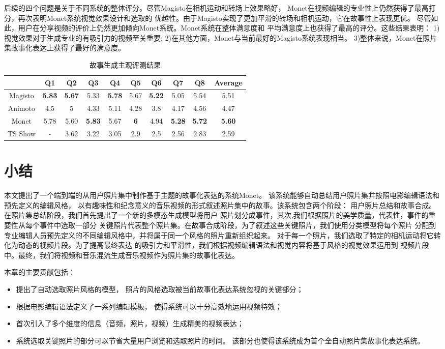 后续的四个问题是关于不同系统的整体评分。尽管Magisto在相机运动和转场上效果略好，
Monet在视频编辑的专业性上仍然获得了最高打分，再次表明Monet系统视觉效果设计和选取的
优越性。由于Magisto实现了更加平滑的转场和相机运动，它在故事性上表现更优。
尽管如此，用户在分享视频的评价上仍然更加倾向Monet系统。Monet系统在整体满意度和
平均满意度上也获得了最高的评分。这些结果表明：
1)视觉效果对于生成专业的有吸引力的视频至关重要;
2)在其他方面，Monet与当前最好的Magisto系统表现相当。
3)整体来说，Monet在照片集故事化表达上获得了最好的满意度。

\begin{table}[htbp]
    \centering
    \caption{故事生成主观评测结果}
    \label{tab:monet-story-remixing-res}
    \begin{tabular}{|c|c|c|c|c|c|c|c|c|c|}
        \hline
        & Q1 & Q2 & Q3 & Q4 & Q5 & Q6 & Q7 & Q8 & Average  \\
        \hline
        Magisto & \textbf{5.83} &\textbf{5.67} & 5.33 & \textbf{5.78} & 5.67 & \textbf{5.22} & 5.05 & 5.54 & 5.51 \\
        Animoto & 4.5 & 5 & 4.33 & 5.11 & 4.28 & 3.8 & 4.17 & 4.56 & 4.47 \\
        Monet & 5.78 & 5.60& \textbf{5.83} & 5.67 & \textbf{6} & 4.94 & \textbf{5.28} & \textbf{5.72} & \textbf{5.60} \\
        TS Show & - & 3.62 & 3.22 & 3.05 & 2.9 & 2.5 & 2.56 & 2.83 & 2.59 \\ \hline
    \end{tabular}
\end{table}

\section{小结}
本文提出了一个端到端的从用户照片集中制作基于主题的故事化表达的系统Monet。
该系统能够自动总结用户照片集并按照电影编辑语法和预先定义的编辑风格，
以有趣味性和纪念意义的音乐视频的形式叙述照片集中的故事。该系统包含两个阶段：
用户照片总结和故事合成。在照片集总结阶段，我们首先提出了一个新的多模态生成模型将用户
照片划分成事件，其次,我们根据照片的美学质量，代表性，事件的重要性从每个事件中选取一部分
关键照片代表整个照片集。在故事合成阶段，为了叙述这些关键照片，我们使用分类模型将每个照片
分配到专业编辑人员预先定义的不同编辑风格中，并将属于同一个风格的照片重新组织起来。
对于每一个照片，我们选取了特定的相机运动将它转化为动态的视频片段。为了提高最终表达
的吸引力和平滑性，我们根据视频编辑语法和视觉内容将基于风格的视觉效果运用到
视频片段中。最终，我们将视频和音乐混流生成音乐视频作为照片集的故事化表达。

本章的主要贡献包括：
\begin{itemize}
    \item 提出了自动选取照片风格的模型，
        照片的风格选取被当前故事化表达系统忽视的关键部分；
    \item 根据电影编辑语法定义了一系列编辑模板，
        使得系统可以十分高效地运用视频特效；
    \item 首次引入了多个维度的信息（音频，照片，视频）生成精美的视频表达；
    \item 系统选取关键照片的部分可以节省大量用户浏览和选取照片的时间。
        该部分也使得该系统成为首个全自动照片集故事化表达系统。
\end{itemize}

